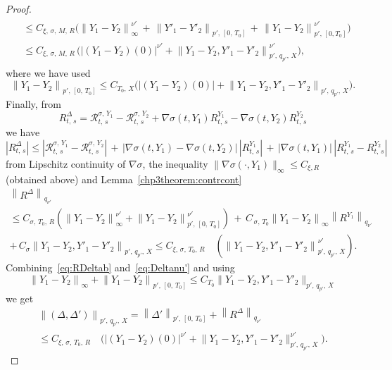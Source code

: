 \documentclass[10pt]{amsart}
\theoremstyle{definition}\newtheorem{defi}[theo]{Definition}\newtheorem{rema}[theo]{Remark}\newtheorem{exam}[theo]{Example}\newtheorem{exem}[theo]{Example}\newtheorem{nota}[theo]{Notation}
\newcommand{\calR}{\mathcal{R}}
\begin{document}
\begin{proof}
\begin{multline}
\begin{aligned}
&\leq C_{\xi,\,\sigma,\,M,\,R} \Big(\left\|Y_1-Y_2\right\|_{\infty}^{\nu'}\,+\,\left\|Y'_1-Y'_2\right\|_{p',\,\left[0,\,T_0\right]}\,+\, \left\|Y_1-Y_2\right\|_{p',\,\left[0,T_0\right]}^{{\nu'}}\Big)\\
&\leq C_{\xi,\,\sigma,\,M,\,R}\,\Big(\left|\left(Y_1-Y_2\right)(0)\right|^{\nu'}+\left\|Y_1-Y_2,Y'_1-Y'_2\right\|^{\nu'}_{p',\,q_{p'},\,X}\Big),
\end{aligned}
\end{multline}
where we have used
\[
\left\|Y_1-Y_2\right\|_{p',\,\left[0,\,T_0\right]}\leq C_{T_0,\,X} \Big(\left|\left(Y_1-Y_2\right)(0)\right|+\left\|Y_1-Y_2,Y'_1-Y'_2\right\|_{p',\,q_{p'},\,X}\Big).
\]
Finally, from
\[
R^{\Delta}_{t,\,s}=\calR^{\sigma,\,Y_1}_{t,\,s}-\calR^{\sigma,\,Y_2}_{t,\,s}+\nabla{\sigma}(t, Y_1)R_{t,\,s}^{Y_1}-\nabla{\sigma}(t, Y_2)R_{t,\,s}^{Y_2}
\]
we have
\[
\left|R^{\Delta}_{t,\,s}\right|\leq \left|\calR^{\sigma,\,Y_1}_{t,\,s}-\calR^{\sigma,\,Y_2}_{t,\,s}\right|\,+\,\big|\nabla{\sigma}\left(t, Y_1\right)-\nabla{\sigma}\left(t, Y_2\right)\big|\,\left|R_{t,\,s}^{Y_1}\right|\, + \,\left|\nabla{\sigma}\left(t, Y_1\right)\right|\,\left|R_{t,\,s}^{Y_1}-R_{t,\,s}^{Y_2}\right|
\]
from Lipschitz continuity of $\nabla\sigma$, the inequality $\|\nabla\sigma(\cdot, Y_1)\|_{\infty} \leq C_{\xi, R}$ (obtained above) and Lemma~\ref{chp3theorem:contrcont}
\begin{multline}\label{eq:RDeltab}
\left\|R^{\Delta}\right\|_{q_{\nu'}}\\
\leq C_{\sigma,\,T_0,\,R}\left(\left\|Y_1-Y_2\right\|^{\nu'}_{\infty}+\left\|Y_1-Y_2\right\|^{\nu'}_{p',\,\left[0,\,T_0\right]}\right)\,+\, C_{\,\sigma,\,T_0} \left\|Y_1-Y_2\right\|_{\infty} \left\|R^{Y_1}\right\|_{q_{\nu'}}\\
+\,C_{\sigma}\left\|Y_1-Y_2,Y'_1-Y'_2\right\|_{p',\,q_{p'},\,X}
\leq C_{\xi,\,\sigma,\,T_0,\,R}\quad \left(\left\|Y_1-Y_2,Y'_1-Y'_2\right\|^{\nu'}_{p',\,q_{p'},\, X}\right).
\end{multline}
Combining~\eqref{eq:RDeltab} and~\eqref{eq:Deltanu'} and using
\[
\left\|Y_1-Y_2\right\|_{\infty}+\left\|Y_1-Y_2\right\|_{p',\,\left[0,\,T_0\right]}\leq C_{T_0}\big\|Y_1-Y_2,Y'_1-Y'_2\big\|_{p',\, q_{p'},\,X}
\]
we get
\begin{multline*}
\left\|\left(\Delta,\Delta'\right)\right\|_{p',\, q_{p'},\,X}= \left\|\Delta'\right\|_{p',\,\left[0,\,T_0\right]}+ \left\|R^{\Delta}\right\|_{q_{\nu'}}\\
\leq C_{\xi,\,\sigma,\,T_0,\,R}\quad \Big(\left|\left(Y_1-Y_2\right)(0)\right|^{\nu'}+\big\|Y_1-Y_2,Y'_1-Y'_2\big\|^{\nu'}_{p',\,q_{p'},\,X}\Big).

\end{multline*}
\end{proof}
\end{document}

